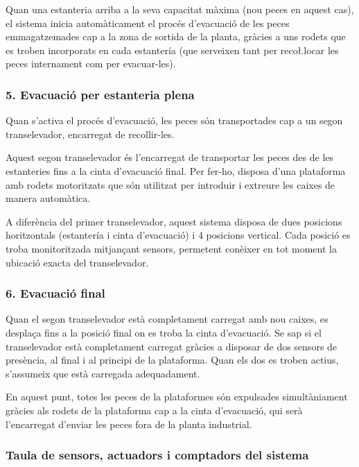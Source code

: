 \documentclass[a4paper,11pt,DIV=13,headings=normal,abstract=true,twoside=semi]{article}
\begin{document}
Quan una estanteria arriba a la seva capacitat màxima (nou peces en aquest cas), el sistema inicia automàticament el procés d'evacuació de les peces emmagatzemades cap a la zona de sortida de la planta, gràcies a uns rodets que es troben incorporats en cada estantería (que serveixen tant per reco\l.locar les peces internament com per evacuar-les).

\subsubsection*{5. Evacuació per estanteria plena}

Quan s'activa el procés d'evacuació, les peces són transportades cap a un segon transelevador, encarregat de recollir-les.

Aquest segon transelevador és l'encarregat de transportar les peces des de les estanteries fins a la cinta d'evacuació final. Per fer-ho, disposa d'una plataforma amb rodets motoritzats que són utilitzat per introduir i extreure les caixes de manera automàtica.

A diferència del primer transelevador, aquest sistema disposa de dues posicions horitzontals (estantería i cinta d'evacuació) i 4 posicions vertical. Cada posició es troba monitoritzada mitjançant sensors, permetent conèixer en tot moment la ubicació exacta del transelevador.

\subsubsection*{6. Evacuació final}

Quan el segon transelevador està completament carregat amb nou caixes, es desplaça fins a la posició final on es troba la cinta d'evacuació. Se sap si el transelevador està completament carregat gràcies a disposar de dos sensors de presència, al final i al principi de la plataforma. Quan els dos es troben actius, s'assumeix que està carregada adequadament.

En aquest punt, totes les peces de la plataformes són expulsades simultàniament gràcies als rodets de la plataforma cap a la cinta d'evacuació, qui serà l'encarregat d'enviar les peces fora de la planta industrial.

\subsubsection{Taula de sensors, actuadors i comptadors del sistema}
\label{sec:tables}
\end{document}

